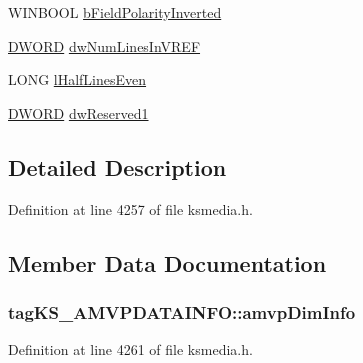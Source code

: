 \begin{DoxyCompactItemize}
\item 
W\+I\+N\+B\+O\+OL \hyperlink{structtag_k_s___a_m_v_p_d_a_t_a_i_n_f_o_ab69352cb8d02d04d4325d49641771d61}{b\+Field\+Polarity\+Inverted}
\item 
\hyperlink{mapinls_8h_ad342ac907eb044443153a22f964bf0af}{D\+W\+O\+RD} \hyperlink{structtag_k_s___a_m_v_p_d_a_t_a_i_n_f_o_a4dbd0224a5c6af1b7691b2a430ce7000}{dw\+Num\+Lines\+In\+V\+R\+EF}
\item 
L\+O\+NG \hyperlink{structtag_k_s___a_m_v_p_d_a_t_a_i_n_f_o_aa20e387f856313443db2bce008af0379}{l\+Half\+Lines\+Even}
\item 
\hyperlink{mapinls_8h_ad342ac907eb044443153a22f964bf0af}{D\+W\+O\+RD} \hyperlink{structtag_k_s___a_m_v_p_d_a_t_a_i_n_f_o_ac0b30debf1e82ff9b7b3aca9ad5485e2}{dw\+Reserved1}
\end{DoxyCompactItemize}


\subsection{Detailed Description}


Definition at line 4257 of file ksmedia.\+h.



\subsection{Member Data Documentation}
\subsubsection[{\texorpdfstring{amvp\+Dim\+Info}{amvpDimInfo}}]{ tag\+K\+S\+\_\+\+A\+M\+V\+P\+D\+A\+T\+A\+I\+N\+F\+O\+::amvp\+Dim\+Info}\hypertarget{structtag_k_s___a_m_v_p_d_a_t_a_i_n_f_o_ac9951504f8a11f5299fa6db837d5c43c}{}\label{structtag_k_s___a_m_v_p_d_a_t_a_i_n_f_o_ac9951504f8a11f5299fa6db837d5c43c}


Definition at line 4261 of file ksmedia.\+h.

